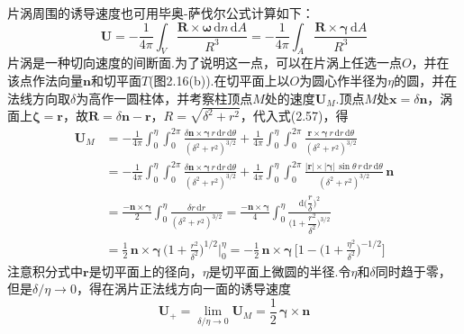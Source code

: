 片涡周围的诱导速度也可用毕奥-萨伐尔公式计算如下：
\begin{equation*}
\boldsymbol{U}=-\frac{1}{4\pi}\int_V \frac{\boldsymbol{R}\times\boldsymbol{\omega}\,\mathrm{d}n\,\mathrm{d}A}{R^{3}}=-\frac{1}{4\pi}\int_A \frac{\boldsymbol{R}\times\boldsymbol{\gamma}\,\mathrm{d}A}{R^{3}}
\tag{2.57}
\end{equation*}
片涡是一种切向速度的间断面.为了说明这一点，可以在片涡上任选一点$O$，并在该点作法向量$\boldsymbol{n}$和切平面$T$(图2.16(b)).在切平面上以$O$为圆心作半径为$\eta$的圆，并在法线方向取$\delta$为高作一圆柱体，并考察柱顶点$M$处的速度$\boldsymbol{U}_M$.顶点$M$处$\boldsymbol{x}=\delta\boldsymbol{n}$，涡面上$\boldsymbol{\zeta}=\boldsymbol{r}$，故$\boldsymbol{R}=\delta\boldsymbol{n}-\boldsymbol{r}$，$R=\sqrt{\delta^{2}+r^{2}}$，代入式(2.57)，得
\begin{align*}
\boldsymbol{U}_M&=-\frac{1}{4\pi}\int_0^{\eta}\!\!\int_0^{2\pi} \frac{\delta\boldsymbol{n}\times\boldsymbol{\gamma}\,r\,\mathrm{d}r\,\mathrm{d}\theta}{(\delta^{2}+r^{2})^{3/2}}+\frac{1}{4\pi}\int_0^{\eta}\!\!\int_0^{2\pi} \frac{\boldsymbol{r}\times\boldsymbol{\gamma}\,r\,\mathrm{d}r\,\mathrm{d}\theta}{(\delta^{2}+r^{2})^{3/2}}\\
&=-\frac{1}{4\pi}\int_0^{\eta}\!\!\int_0^{2\pi} \frac{\delta\boldsymbol{n}\times\boldsymbol{\gamma}\,r\,\mathrm{d}r\,\mathrm{d}\theta}{(\delta^{2}+r^{2})^{3/2}}+\frac{1}{4\pi}\int_0^{\eta}\!\!\int_0^{2\pi} \frac{|\boldsymbol{r}|\times|\boldsymbol{\gamma}|\,\sin\theta\,r\,\mathrm{d}r\,\mathrm{d}\theta}{(\delta^{2}+r^{2})^{3/2}}\,\boldsymbol{n}\\
&=\frac{-\boldsymbol{n}\times\boldsymbol{\gamma}}{2}\int_0^{\eta} \frac{\delta r\,\mathrm{d}r}{(\delta^{2}+r^{2})^{3/2}}=\frac{-\boldsymbol{n}\times\boldsymbol{\gamma}}{4}\int_0^{\eta} \frac{\mathrm{d}\big(\dfrac{r}{\delta}\big)^{2}}{\Big(1+\dfrac{r^{2}}{\delta^{2}}\Big)^{3/2}}\\
&=\frac{1}{2}\,\boldsymbol{n}\times\boldsymbol{\gamma}\,\Big(1+\frac{r^{2}}{\delta^{2}}\Big)^{1/2}\bigg|_0^{\eta}=-\frac{1}{2}\,\boldsymbol{n}\times\boldsymbol{\gamma}\,\Big[1-\Big(1+\frac{\eta^{2}}{\delta^{2}}\Big)^{-1/2}\Big]
\end{align*}
注意积分式中$\boldsymbol{r}$是切平面上的径向，$\eta$是切平面上微圆的半径.令$\eta$和$\delta$同时趋于零，但是$\delta/\eta\to 0$，得在涡片正法线方向一面的诱导速度
\begin{equation*}
\boldsymbol{U}_{+}=\lim_{\delta/\eta\to 0}\boldsymbol{U}_M=\frac{1}{2}\,\boldsymbol{\gamma}\times\boldsymbol{n}
\tag{2.58}
\end{equation*}
